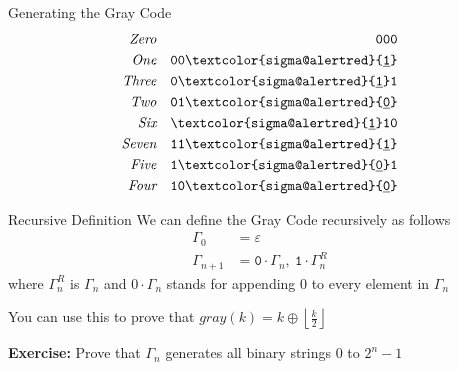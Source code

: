 \documentclass[aspectratio=169]{beamer}
\begin{document}
\begin{frame}{Generating the Gray Code}
    \begin{align*}
        \textit{Zero}& &\texttt{000}  \\
        \textit{One}&  &\texttt{00\textcolor{sigma@alertred}{\underline{1}}}  \\
        \textit{Three} &  &\texttt{0\textcolor{sigma@alertred}{\underline{1}}1}  \\
        \textit{Two} &  &\texttt{01\textcolor{sigma@alertred}{\underline{0}}}  \\
        \textit{Six}    & &\texttt{\textcolor{sigma@alertred}{\underline{1}}10}  \\
        \textit{Seven}      &  &\texttt{11\textcolor{sigma@alertred}{\underline{1}}}  \\
        \textit{Five}    &  &\texttt{1\textcolor{sigma@alertred}{\underline{0}}1}  \\
        \textit{Four}    &  &\texttt{10\textcolor{sigma@alertred}{\underline{0}}}  \\
    \end{align*}
\end{frame}

\begin{frame}{Recursive Definition}
    We can define the Gray Code recursively as follows
    \begin{equation}\label{rec_gray}
    \begin{split}
        \Gamma_0 &= \varepsilon \\
        \Gamma_{n + 1} &= \texttt{0} \cdot \Gamma_n,~ \texttt{1} \cdot \Gamma_n^R
    \end{split}
    \end{equation}
    where $\Gamma_n^R$ is $\Gamma_n$ and $0 \cdot \Gamma_n$ stands for appending 0 to every element in $\Gamma_n$ \pause
    
    \vspace{10pt}
    
    You can use this to prove that $gray(k) = k \oplus \left\lfloor \frac{k}{2} \right\rfloor$
    
    \vspace{60pt}    

    \textcolor{sigma@alertred}{\textbf{Exercise:}} Prove that $\Gamma_n$ generates all binary strings $0$ to $2^n - 1$
\end{frame}
\end{document}
